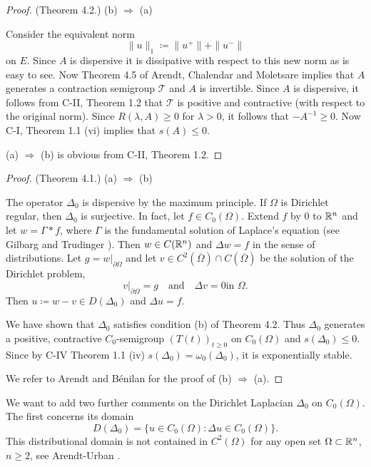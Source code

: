 \begin{proof}(Theorem 4.2.) 
(b) $\Rightarrow$ (a)

Consider the equivalent norm
\[
\|u\|_1 \coloneq \|u^+\| + \|u^-\|
\]
on $E$. 
Since $A$ is dispersive it is dissipative with respect to this new norm as is easy to see. Now Theorem 4.5 of Arendt, Chalendar and Moletsare \cite{ACM24} implies that $A$ generates a contraction semigroup $\mathcal{T}$ and $A$ is invertible. Since $A$ is dispersive, it follows from C-II, Theorem 1.2 that $\mathcal{T}$ is positive and contractive (with respect to the original norm). Since $R(\lambda, A) \geq 0$ for $\lambda > 0$, it follows that $-A^{-1} \geq 0$. Now C-I, Theorem 1.1 (vi) implies that $s(A) \leq 0$.

(a) $\Rightarrow$ (b) is obvious from C-II, Theorem 1.2. 

\end{proof}
\begin{proof}(Theorem 4.1.)  
(a) $\Rightarrow$ (b)

The operator $\Delta_0$ is dispersive by the maximum principle. 
If $\Omega$ is Dirichlet regular, then $\Delta_0$ is surjective. In fact, let $f \in C_0(\Omega)$. Extend $f$ by $0$ to $\mathbb{R}^n$ and let $w = \Gamma * f$, where $\Gamma$ is the fundamental solution of Laplace's equation (see Gilbarg and Trudinger \cite[2.12]{GT83}). 
Then $w \in C(\mathbb{R}^n)$ and $\Delta w = f$ in the sense of distributions. 
Let $g = w|_{\partial\Omega}$ and let $v \in C^2(\overline{\Omega}) \cap C(\overline{\Omega})$ be the solution of the Dirichlet problem, \ie 
%
\[
	v|_{\partial\Omega} = g 
	\quad \text{and} \quad \Delta v = 0 \text{in $\Omega$.}
\]
%
Then $u \coloneq w - v \in D(\Delta_0)$ and $\Delta u = f$.

We have shown that $\Delta_0$ satisfies condition (b) of Theorem 4.2. 
Thus $\Delta_0$ generates a positive, contractive $C_0$-semigroup $(T(t))_{t \geq 0}$ on $C_0(\Omega)$ and $s(\Delta_0) \leq 0$. 
Since by C-IV Theorem 1.1 (iv) $s(\Delta_0) = \omega_{0}(\Delta_0)$, it is exponentially stable.

We refer to Arendt and Bénilan \cite{ArBe99} for the proof of (b) $\Rightarrow$ (a).
\end{proof}
We want to add two further comments on the Dirichlet Laplacian $\Delta_0$ on $C_0(\Omega)$. The first concerns its domain
\[
D(\Delta_0) = \{u \in C_0(\Omega) \colon \Delta u \in C_0(\Omega)\}.
\]
This distributional domain is not contained in $C^2(\Omega)$ for any open set $\Omega \subset \mathbb{R}^n$, $n \geq 2$, see Arendt-Urban \cite[Theorem 6.60]{Au23}. 

